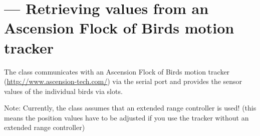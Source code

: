
\section{ ---
         Retrieving values from an Ascension Flock of Birds\textsuperscript{\textregistered} motion tracker}

The  class communicates with an Ascension Flock
of Birds\textsuperscript{\textregistered} motion tracker 
(\url{http://www.ascension-tech.com/}) via the serial port and provides the 
sensor values of the individual birds via slots.

Note: Currently, the class assumes that an extended range controller is
used! (this means the position values have to be adjusted if you use the
tracker without an extended range controller)

